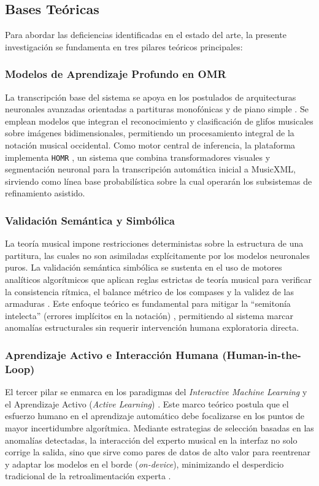 \subsection{Bases Te\'oricas}
\label{sec:bases-teoricas}

Para abordar las deficiencias identificadas en el estado del arte, la presente investigaci\'on se fundamenta en tres pilares te\'oricos principales:

\subsubsection{Modelos de Aprendizaje Profundo en OMR}
La transcripci\'on base del sistema se apoya en los postulados de arquitecturas neuronales avanzadas orientadas a partituras monof\'onicas y de piano simple \cite{calvo2018}\cite{riosvila2026}. Se emplean modelos que integran el reconocimiento y clasificaci\'on de glifos musicales sobre im\'agenes bidimensionales, permitiendo un procesamiento integral de la notaci\'on musical occidental. Como motor central de inferencia, la plataforma implementa \texttt{HOMR} \cite{homr2024}, un sistema que combina transformadores visuales y segmentaci\'on neuronal para la transcripci\'on autom\'atica inicial a MusicXML, sirviendo como l\'inea base probabil\'istica sobre la cual operar\'an los subsistemas de refinamiento asistido.

\subsubsection{Validaci\'on Sem\'antica y Simb\'olica}
La teor\'ia musical impone restricciones deterministas sobre la estructura de una partitura, las cuales no son asimiladas expl\'icitamente por los modelos neuronales puros. La validaci\'on sem\'antica simb\'olica se sustenta en el uso de motores anal\'iticos algor\'itmicos que aplican reglas estrictas de teor\'ia musical para verificar la consistencia r\'itmica, el balance m\'etrico de los compases y la validez de las armaduras \cite{cuthbert2010}. Este enfoque te\'orico es fundamental para mitigar la ``semiton\'ia intelecta'' (errores impl\'icitos en la notaci\'on) \cite{rizo2023}, permitiendo al sistema marcar anomal\'ias estructurales sin requerir intervenci\'on humana exploratoria directa.

\subsubsection{Aprendizaje Activo e Interacci\'on Humana (Human-in-the-Loop)}
El tercer pilar se enmarca en los paradigmas del \emph{Interactive Machine Learning} \cite{amershi2014}\cite{holzinger2016} y el Aprendizaje Activo (\emph{Active Learning}) \cite{settles2009}. Este marco te\'orico postula que el esfuerzo humano en el aprendizaje autom\'atico debe focalizarse en los puntos de mayor incertidumbre algor\'itmica. Mediante estrategias de selecci\'on basadas en las anomal\'ias detectadas, la interacci\'on del experto musical en la interfaz no solo corrige la salida, sino que sirve como pares de datos de alto valor para reentrenar y adaptar los modelos en el borde (\emph{on-device}), minimizando el desperdicio tradicional de la retroalimentaci\'on experta \cite{mlsp2025}.

